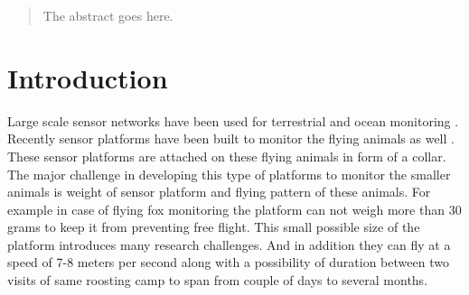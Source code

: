 \documentclass[conference]{IEEEtran}
\begin{document}




\maketitle


\begin{abstract}
The abstract goes here.
\end{abstract}





%
\IEEEpeerreviewmaketitle
\section{Introduction}\label{sec:intro}

Large scale sensor networks have been used for terrestrial \cite{robo-mote} and ocean monitoring \cite{Vasilescu05krill:an}. Recently sensor platforms have been built to monitor the flying animals as well \cite{Anthony:2012:STC:2185677.2185747} \cite{raja-ipsn}. These sensor platforms are attached on these flying animals in form of a collar. The major challenge in developing this type of platforms to monitor the smaller animals is weight of sensor platform and flying pattern of these animals. For example in case of flying fox monitoring the platform can not weigh more than 30 grams to keep it from preventing free flight. This small possible size of the platform introduces many research challenges\cite{raja-ipsn}. And in addition they can fly at a speed of 7-8 meters per second along with a possibility of duration between two visits of same roosting camp to span from couple of days to several months.\
\end{document}

